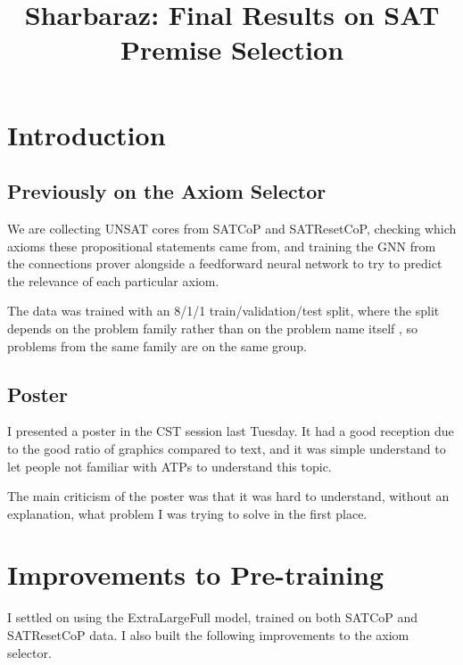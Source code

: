 \documentclass[10pt,a4paper,twocolumn]{article}
\title{\LARGE\bfseries\rmfamily Sharbaraz: Final Results on SAT Premise Selection}
\date{}
\newcommand{\cop}[1]{\textsf{#1}}
\begin{document}
\maketitle

\section{Introduction}

\subsection{Previously on the Axiom Selector}

We are collecting UNSAT cores from \cop{SATCoP}\cite{eliminatingmodels} and \cop{SATResetCoP}, checking which axioms these propositional statements came from, and training the GNN from the connections prover\cite{connections_2023} alongside a feedforward neural network to try to predict the relevance of each particular axiom.

The data was trained with an 8/1/1 train/validation/test split, where the split depends on the problem family  rather than on the problem name itself , so problems from the same family are on the same group.


\subsection{Poster}

I presented a poster in the CST session last Tuesday.
It had a good reception due to the good ratio of graphics compared to text, and it was simple understand to let people not familiar with ATPs to understand this topic.

The main criticism of the poster was that it was hard to understand, without an explanation, what problem I was trying to solve in the first place.


\section{Improvements to Pre-training}

I settled on using the \cop{ExtraLargeFull} model, trained on both \cop{SATCoP} and \cop{SATResetCoP} data.
I also built the following improvements to the axiom selector.
\end{document}
